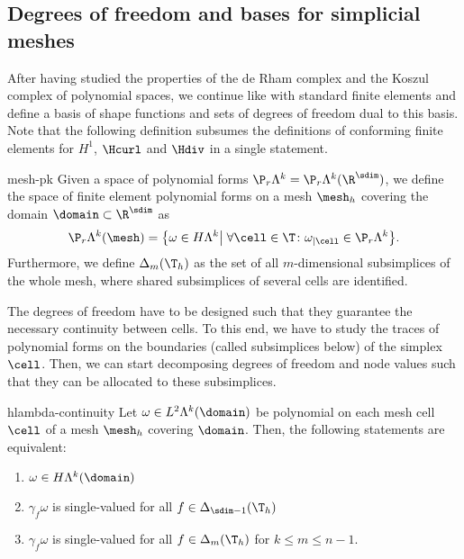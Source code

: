 \subsection{Degrees of freedom and bases for simplicial meshes}

\begin{intro}
  After having studied the properties of the de Rham complex and the
  Koszul complex of polynomial spaces, we continue like with standard
  finite elements and define a basis of shape functions and sets of
  degrees of freedom dual to this basis. Note that the following
  definition subsumes the definitions of conforming finite elements
  for $H^1$, $\Hcurl$ and $\Hdiv$ in a single statement.
\end{intro}

\begin{Definition}{mesh-pk}
  Given a space of polynomial forms
  $\P_r\Lambda^k=\P_r\Lambda^k(\R^\sdim)$, we define the space of finite
  element polynomial forms on a mesh $\mesh_h$ covering the domain
  $\domain\subset\R^\sdim$ as
  \begin{gather}
    \P_r\Lambda^k(\mesh) = \bigl\{
    \omega \in H\Lambda^k \big|
    \;\forall \cell\in\T\colon \omega_{|\cell} \in \P_r\Lambda^k
    \bigr\}.
  \end{gather}
  Furthermore, we define $\Delta_m(\T_h)$ as the set of all
  $m$-dimensional subsimplices of the whole mesh, where shared
  subsimplices of several cells are identified.
\end{Definition}

\begin{intro}
  The degrees of freedom have to be designed such that they guarantee
  the necessary continuity between cells. To this end, we have to
  study the traces of polynomial forms on the boundaries (called
  subsimplices below) of the simplex $\cell$. Then, we can start
  decomposing degrees of freedom and node values such that they can be
  allocated to these subsimplices.
\end{intro}

\begin{Theorem}{hlambda-continuity}
  Let $\omega\in L^2\Lambda^k(\domain)$ be polynomial on each mesh
  cell $\cell$ of a mesh $\mesh_h$ covering $\domain$. Then, the
  following statements are equivalent:
  \begin{enumerate}
  \item $\omega\in H\Lambda^k(\domain)$
  \item $\gamma_f\omega$ is single-valued for all $f\in\Delta_{\sdim-1}(\T_h)$
  \item $\gamma_f\omega$ is single-valued for all $f\in\Delta_{m}(\T_h)$ for
    $k\le m \le n-1$.
  \end{enumerate}
\end{Theorem}

